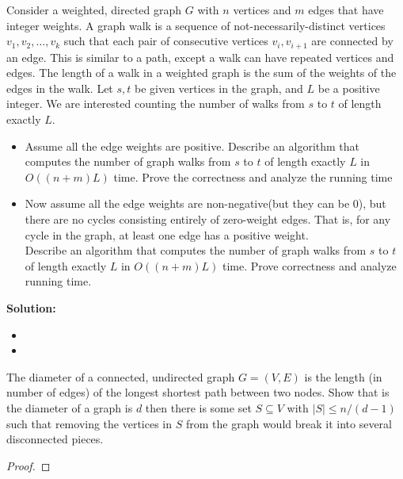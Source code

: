 \documentclass{article}
\newcounter{exercise}
\newcommand{\<}{
    \langle}
\renewcommand{\>}{
    \rangle}
\begin{document}
{\begin{exercise}
Consider a weighted, directed graph $G$ with $n$ vertices and $m$ edges that have integer weights. A graph walk is a sequence of
not-necessarily-distinct vertices $v_1,v_2,\ldots,v_k$ such that each pair of consecutive vertices $v_i,v_{i+1}$ are connected by an edge. This is similar to a path, except a walk can have repeated vertices and edges. The length of a walk in a weighted graph is the sum of the weights of the edges in the walk. Let $s,t$ be given vertices in the graph, and $L$ be a positive integer. We are interested counting the number of walks from $s$ to $t$ of length exactly $L$.
\begin{itemize}
\item Assume all the edge weights are positive. Describe an algorithm that computes the number of graph walks from $s$ to $t$ of length exactly $L$ in $O((n+m)L)$ time. Prove the correctness and analyze the running time
\item Now assume all the edge weights are non-negative(but they can be 0), but there are no cycles consisting entirely of zero-weight edges. That is, for any cycle in the graph, at least one edge has a positive weight.\\
Describe an algorithm that computes the number of graph walks from $s$ to $t$ of length exactly $L$ in $O((n+m)L)$ time. Prove correctness and analyze running time.
\end{itemize}
\end{exercise}
\textbf{Solution:}
    \leavevmode\newline
    \begin{itemize}
        \item
        \item
    \end{itemize}





\begin{exercise}
The diameter of a connected, undirected graph $G=(V,E)$ is the length (in number of edges) of the longest shortest path between two nodes. Show that is the diameter of a graph is $d$ then there is some set $S\subseteq V$ with $|S|\leq n/(d-1)$ such that removing the vertices in $S$ from the graph would break it into several disconnected pieces.

\end{exercise}
\begin{proof} 
    \leavevmode\newline


\end{proof}}
\end{document}
